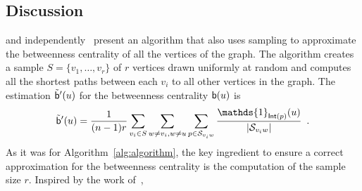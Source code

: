 \subsection{Discussion}\label{sec:discussion}
\citet{JacobKLPT05} and independently~\citet{BrandesP07} present an algorithm
that also uses sampling to approximate the betweenness centrality of all the
vertices of the graph. The algorithm creates a sample $S=\{v_1,\dotsc,v_r\}$ of
$r$ vertices drawn uniformly at random and computes all the shortest paths
between each $v_i$ to all other vertices in the graph. The estimation
$\tilde{\mathsf{b}}'(u)$ for the betweenness centrality $\mathsf{b}(u)$ is
\[ 
\tilde\betw'(u)= \frac{1}{(n-1)r}\sum_{v_i\in S}\sum_{w\neq v_i,w\neq
u}\sum_{p\in\mathcal{S}_{v_iw}}\frac{\mathds{1}_{\mathsf{Int}(p)}(u)}{|\mathcal{S}_{v_iw}|}\enspace.
\]
As it was for Algorithm~\ref{alg:algorithm}, the key ingredient to ensure a correct
approximation for the betweenness centrality is the computation of the sample
size $r$. Inspired by the work of~\citet{EppsteinW04}, \citet{BrandesP07} 
%
